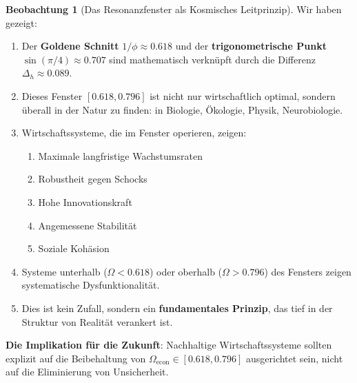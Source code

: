 \documentclass[a4paper,12pt,twoside]{report}
\theoremstyle{definition}
\newtheorem{beobachtung}{Beobachtung}
\begin{document}
\begin{beobachtung}[Das Resonanzfenster als Kosmisches Leitprinzip]

Wir haben gezeigt:

\begin{enumerate}
	\item Der \textbf{Goldene Schnitt} $1/\phi \approx 0.618$ und der \textbf{trigonometrische Punkt} $\sin(\pi/4) \approx 0.707$ sind mathematisch verknüpft durch die Differenz $\Delta_h \approx 0.089$.
	
	\item Dieses Fenster $[0.618, 0.796]$ ist nicht nur wirtschaftlich optimal, sondern überall in der Natur zu finden: in Biologie, Ökologie, Physik, Neurobiologie.
	
	\item Wirtschaftssysteme, die im Fenster operieren, zeigen:
	\begin{enumerate}
		\item Maximale langfristige Wachstumsraten
		\item Robustheit gegen Schocks
		\item Hohe Innovationskraft
		\item Angemessene Stabilität
		\item Soziale Kohäsion
	\end{enumerate}
	
	\item Systeme unterhalb ($\Omega < 0.618$) oder oberhalb ($\Omega > 0.796$) des Fensters zeigen systematische Dysfunktionalität.
	
	\item Dies ist kein Zufall, sondern ein \textbf{fundamentales Prinzip}, das tief in der Struktur von Realität verankert ist.
\end{enumerate}

\textbf{Die Implikation für die Zukunft}: Nachhaltige Wirtschaftssysteme sollten explizit auf die Beibehaltung von $\Omega_{\text{econ}} \in [0.618, 0.796]$ ausgerichtet sein, nicht auf die Eliminierung von Unsicherheit.

\end{beobachtung}
\end{document}
